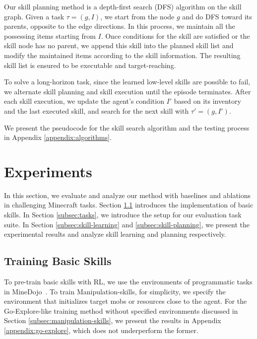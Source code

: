 \documentclass{article}
\begin{document}
Our skill planning method is a depth-first search (DFS) algorithm on the skill graph. Given a task $\tau=(g,I)$, we start from the node $g$ and do DFS toward its parents, opposite to the edge directions. In this process, we maintain all the possessing items starting from $I$. Once conditions for the skill are satisfied or the skill node has no parent, we append this skill into the planned skill list and modify the maintained items according to the skill information. The resulting skill list is ensured to be executable and target-reaching. %

To solve a long-horizon task, since the learned low-level skills are possible to fail, we alternate skill planning and skill execution until the episode terminates. After each skill execution, we update the agent's condition $I'$ based on its inventory and the last executed skill, and search for the next skill with $\tau'=(g,I')$. %

We present the pseudocode for the skill search algorithm and the testing process in Appendix \ref{appendix:algorithms}.

\section{Experiments}
In this section, we evaluate and analyze our method with baselines and ablations in challenging Minecraft tasks. Section \ref{subsec:pretrain} introduces the implementation of basic skills. In Section \ref{subsec:tasks}, we introduce the setup for our evaluation task suite. In Section \ref{subsec:skill-learning} and \ref{subsec:skill-planning}, we present the experimental results and analyze skill learning and planning respectively.

\subsection{Training Basic Skills}
\label{subsec:pretrain}
To pre-train basic skills with RL, we use the environments of programmatic tasks in MineDojo~\citep{minedojo}. 
To train Manipulation-skills, for simplicity, we specify the environment that initializes target mobs or resources close to the agent. For the Go-Explore-like training method without specified environments discussed in Section \ref{subsec:manipulation-skills}, we present the results in Appendix \ref{appendix:go-explore}, which does not underperform the former.
\end{document}
